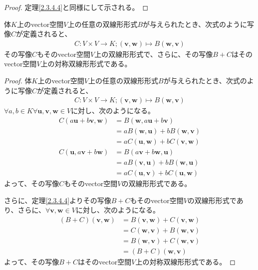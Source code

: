 \documentclass[dvipdfmx]{jsarticle}
\begin{document}
\begin{proof} 定理\ref{2.3.4.4}と同様にして示される。
\end{proof}
\begin{thm}\label{2.3.4.6}
体$K$上のvector空間$V$上の任意の双線形形式$B$が与えられたとき、次式のように写像$C$が定義されると、
\begin{align*}
C:V \times V \rightarrow K;\left( \mathbf{v},\mathbf{w} \right) \mapsto B\left( \mathbf{w},\mathbf{v} \right)
\end{align*}
その写像$C$もそのvector空間$V$上の双線形形式で、さらに、その写像$B + C$はそのvector空間$V$上の対称双線形形式である。
\end{thm}
\begin{proof}
体$K$上のvector空間$V$上の任意の双線形形式$B$が与えられたとき、次式のように写像$C$が定義されると、
\begin{align*}
C:V \times V \rightarrow K;\left( \mathbf{v},\mathbf{w} \right) \mapsto B\left( \mathbf{w},\mathbf{v} \right)
\end{align*}
$\forall a,b \in K\forall\mathbf{u},\mathbf{v},\mathbf{w} \in V$に対し、次のようになる。
\begin{align*}
C\left( a\mathbf{u} + b\mathbf{v},\mathbf{w} \right) &= B\left( \mathbf{w},a\mathbf{u} + b\mathbf{v} \right)\\
&= aB\left( \mathbf{w},\mathbf{u} \right) + bB\left( \mathbf{w},\mathbf{v} \right)\\
&= aC\left( \mathbf{u},\mathbf{w} \right) + bC\left( \mathbf{v},\mathbf{w} \right)\\
C\left( \mathbf{u},a\mathbf{v} + b\mathbf{w} \right) &= B\left( a\mathbf{v} + b\mathbf{w},\mathbf{u} \right)\\
&= aB\left( \mathbf{v},\mathbf{u} \right) + bB\left( \mathbf{w},\mathbf{u} \right)\\
&= aC\left( \mathbf{u},\mathbf{v} \right) + bC\left( \mathbf{u},\mathbf{w} \right)
\end{align*}
よって、その写像$C$もそのvector空間$V$の双線形形式である。\par
さらに、定理\ref{2.3.4.4}よりその写像$B + C$もそのvector空間$V$の双線形形式であり、さらに、$\forall\mathbf{v},\mathbf{w} \in V$に対し、次のようになる。
\begin{align*}
(B + C)\left( \mathbf{v},\mathbf{w} \right) &= B\left( \mathbf{v},\mathbf{w} \right) + C\left( \mathbf{v},\mathbf{w} \right)\\
&= C\left( \mathbf{w},\mathbf{v} \right) + B\left( \mathbf{w},\mathbf{v} \right)\\
&= B\left( \mathbf{w},\mathbf{v} \right) + C\left( \mathbf{w},\mathbf{v} \right)\\
&= (B + C)\left( \mathbf{w},\mathbf{v} \right)
\end{align*}
よって、その写像$B + C$はそのvector空間$V$上の対称双線形形式である。
\end{proof}
\end{document}

